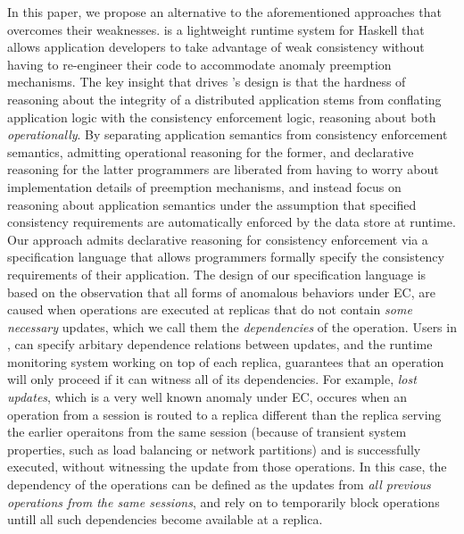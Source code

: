 In this paper, we propose an alternative to the aforementioned
approaches that overcomes their weaknesses.  \tool is a lightweight
runtime system for Haskell that allows application developers to take
advantage of weak consistency without having to re-engineer their code
to accommodate anomaly preemption mechanisms.  The key insight that
drives \tool's design is that the hardness of reasoning about the
integrity of a distributed application stems from conflating
application logic with the consistency enforcement logic, reasoning
about both \emph{operationally}.  By separating application semantics
from consistency enforcement semantics, admitting operational
reasoning for the former, and declarative reasoning for the latter
programmers are liberated from having to worry about implementation details of
preemption mechanisms, and instead focus on reasoning about
application semantics under the assumption that specified consistency
requirements are automatically enforced by the data store at runtime.  
%
Our approach admits declarative reasoning for consistency enforcement via
a specification language that allows programmers formally specify the
consistency requirements of their application. 
The design of our
specification language is based on the observation that all forms of
anomalous behaviors under EC, are caused when operations are executed at replicas
that do not contain \emph{some necessary} updates, which we call
them the \emph{dependencies} of the operation. Users in \tool, can
specify arbitary dependence relations between updates, and the 
runtime monitoring system working on top of each replica, guarantees that an 
operation will only proceed if it can witness all of its dependencies. 
For example, \emph{lost updates}, which is a very well known anomaly
under EC, occures when an operation from a session
is routed to a replica different than the replica serving the earlier
operaitons from the same session (because of transient system
properties, such as load balancing or network partitions)
and is successfully executed, without witnessing the update from those operations.
In this case, the dependency of the operations can be defined as the
updates from \emph{all previous operations from the same sessions}, and
rely on \tool to temporarily block operations untill all such
dependencies become available at a replica.

